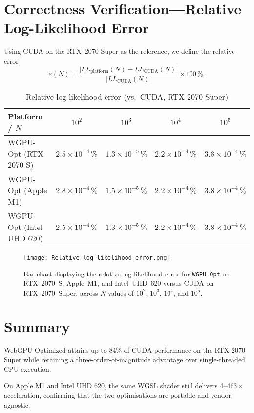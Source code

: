 \documentclass[PhD]{PHlab-thesis}
\begin{document}
\section{Correctness Verification—Relative Log-Likelihood Error}
Using CUDA on the RTX~2070 Super as the reference, we define the relative error
\[
  \varepsilon(N)=
  \frac{\lvert LL_{\text{platform}}(N)-LL_{\text{CUDA}}(N)\rvert}
       {\lvert LL_{\text{CUDA}}(N)\rvert}\times100\,\%.
\]

\begin{table}[h]
  \centering
  \caption{Relative log-likelihood error (vs.\ CUDA, RTX 2070 Super)}
  \label{tab:likelihood_error}
  \setlength{\tabcolsep}{6pt}
  \renewcommand{\arraystretch}{1.9}
  \small
  \begin{tabularx}{\textwidth}{@{}X c c c c@{}}
    \toprule
    Platform / $N$      & $10^{2}$ & $10^{3}$ & $10^{4}$ & $10^{5}$ \\
    \midrule
    WGPU-Opt (RTX 2070 S)  & $2.5\times10^{-4}\,\%$ & $1.3\times10^{-5}\,\%$ & $2.2\times10^{-4}\,\%$ & $3.8\times10^{-4}\,\%$ \\
    WGPU-Opt (Apple M1)    & $2.8\times10^{-4}\,\%$ & $1.5\times10^{-5}\,\%$ & $2.2\times10^{-4}\,\%$ & $3.8\times10^{-4}\,\%$ \\
    WGPU-Opt (Intel UHD 620)& $2.5\times10^{-4}\,\%$ & $1.3\times10^{-5}\,\%$ & $2.2\times10^{-4}\,\%$ & $3.8\times10^{-4}\,\%$ \\
    \bottomrule
  \end{tabularx}
\end{table}
\newpage
\begin{figure}
    \centering
    \texttt{[image: Relative log-likelihood error.png]}
    \caption{Bar chart displaying the relative log-likelihood error for \texttt{WGPU-Opt} on RTX~2070~S, Apple~M1, and Intel~UHD~620 versus CUDA on RTX~2070~Super, across $N$ values of $10^2$, $10^3$, $10^4$, and $10^5$.}
    \label{log-likelihood error}
\end{figure}


\section{Summary}
WebGPU-Optimized attains up to 84\% of CUDA performance on the RTX 2070 Super while retaining a three-order-of-magnitude advantage over single-threaded CPU execution.  

On Apple M1 and Intel UHD 620, the same WGSL shader still delivers 4–463\,$\times$ acceleration, confirming that the two optimisations are portable and vendor-agnostic.  
\end{document}
